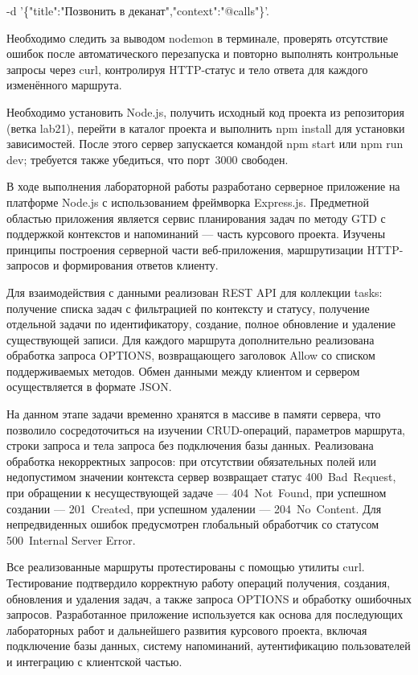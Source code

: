 \documentclass{stp}
\begin{document}
\begin{stpnum}
    -d '\{"title":"Позвонить в деканат","context":"@calls"\}'.
  \item Необходимо следить за выводом nodemon в терминале,
    проверять отсутствие ошибок после автоматического перезапуска и
    повторно выполнять контрольные запросы через curl, контролируя
    HTTP-статус и тело ответа для каждого изменённого маршрута.
  \item Необходимо установить Node.js, получить исходный код проекта
    из репозитория (ветка lab21), перейти в каталог проекта
    и выполнить npm install для установки зависимостей.
    После этого сервер запускается командой npm start или
    npm run dev; требуется также убедиться, что порт~3000
    свободен.
\end{stpnum}


В ходе выполнения лабораторной работы разработано серверное
приложение на платформе Node.js с использованием фреймворка
Express.js. Предметной областью приложения является сервис
планирования задач по методу GTD с поддержкой контекстов и
напоминаний — часть курсового проекта. Изучены принципы построения
серверной части веб-приложения, маршрутизации HTTP-запросов и
формирования ответов клиенту.

Для взаимодействия с данными реализован REST API для коллекции
tasks: получение списка задач с фильтрацией по контексту и
статусу, получение отдельной задачи по идентификатору, создание,
полное обновление и удаление существующей записи. Для каждого
маршрута дополнительно реализована обработка запроса OPTIONS,
возвращающего заголовок Allow со списком поддерживаемых
методов. Обмен данными между клиентом и сервером осуществляется в
формате JSON.

На данном этапе задачи временно хранятся в массиве в памяти сервера,
что позволило сосредоточиться на изучении CRUD-операций, параметров
маршрута, строки запроса и тела запроса без подключения базы данных.
Реализована обработка некорректных запросов: при отсутствии
обязательных полей или недопустимом значении контекста сервер
возвращает статус 400~Bad~Request, при обращении к несуществующей
задаче — 404~Not~Found, при успешном создании — 201~Created, при
успешном удалении — 204~No~Content. Для непредвиденных ошибок
предусмотрен глобальный обработчик со статусом 500~Internal Server
Error.

Все реализованные маршруты протестированы с помощью утилиты curl.
Тестирование подтвердило корректную работу операций получения,
создания, обновления и удаления задач, а также запроса OPTIONS и
обработку ошибочных запросов. Разработанное приложение используется
как основа для последующих лабораторных работ и дальнейшего развития
курсового проекта, включая подключение базы данных, систему
напоминаний, аутентификацию пользователей и интеграцию с клиентской
частью.
\end{document}
